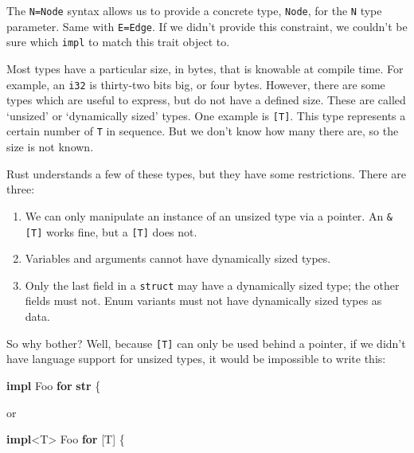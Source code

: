\documentclass[a4paper,]{book}
\newenvironment{Shaded}{\begin{snugshade}}{\end{snugshade}}
\newcommand{\KeywordTok}[1]{\textcolor[rgb]{0.13,0.29,0.53}{\textbf{{#1}}}}
\newcommand{\NormalTok}[1]{{#1}}
\begin{document}
The \texttt{N=Node} syntax allows us to provide a concrete type,
\texttt{Node}, for the \texttt{N} type parameter. Same with
\texttt{E=Edge}. If we didn't provide this constraint, we couldn't be
sure which \texttt{impl} to match this trait object to.


Most types have a particular size, in bytes, that is knowable at compile
time. For example, an \texttt{i32} is thirty-two bits big, or four
bytes. However, there are some types which are useful to express, but do
not have a defined size. These are called `unsized' or `dynamically
sized' types. One example is \texttt{{[}T{]}}. This type represents a
certain number of \texttt{T} in sequence. But we don't know how many
there are, so the size is not known.

Rust understands a few of these types, but they have some restrictions.
There are three:

\begin{enumerate}
\def\labelenumi{\arabic{enumi}.}
\itemsep1pt\parskip0pt
\item
  We can only manipulate an instance of an unsized type via a pointer.
  An \texttt{\&{[}T{]}} works fine, but a \texttt{{[}T{]}} does not.
\item
  Variables and arguments cannot have dynamically sized types.
\item
  Only the last field in a \texttt{struct} may have a dynamically sized
  type; the other fields must not. Enum variants must not have
  dynamically sized types as data.
\end{enumerate}

So why bother? Well, because \texttt{{[}T{]}} can only be used behind a
pointer, if we didn't have language support for unsized types, it would
be impossible to write this:

\begin{Shaded}
\begin{Highlighting}[]
\KeywordTok{impl} \NormalTok{Foo }\KeywordTok{for} \KeywordTok{str} \NormalTok{\{}
\end{Highlighting}
\end{Shaded}

or

\begin{Shaded}
\begin{Highlighting}[]
\KeywordTok{impl}\NormalTok{<T> Foo }\KeywordTok{for} \NormalTok{[T] \{}
\end{Highlighting}
\end{Shaded}
\end{document}
